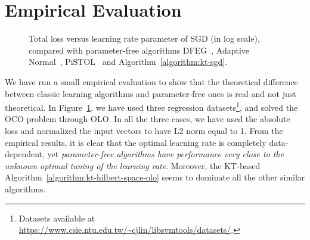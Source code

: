 \section{Empirical Evaluation}

\begin{figure}[t]
\centering
{}
\caption{\footnotesize{Total loss versus learning rate parameter of \ac{SGD} (in log scale), compared with parameter-free algorithms DFEG~\cite{Orabona-2013}, Adaptive Normal~\cite{McMahan-Orabona-2014}, PiSTOL~\cite{Orabona-2014} and Algorithm~\ref{algorithm:kt-sgd}.}}
\label{fig:exp_olo}
\end{figure}

We have run a small empirical evaluation to show that the theoretical difference
between classic learning algorithms and parameter-free ones is real and not just theoretical. In
Figure~\ref{fig:exp_olo}, we have used three regression
datasets\footnote{Datasets available at
\url{https://www.csie.ntu.edu.tw/~cjlin/libsvmtools/datasets/}.}, and solved the
\ac{OCO} problem through \ac{OLO}. In all the three cases, we have used the
absolute loss and normalized the input vectors to have L2 norm equal to 1. From
the empirical results, it is clear that the optimal learning rate is completely
data-dependent, yet \emph{parameter-free algorithms have performance very close
to the unknown optimal tuning of the learning rate}. Moreover, the KT-based
Algorithm~\ref{algorithm:kt-hilbert-space-olo} seems to dominate all the other
similar algorithms.
